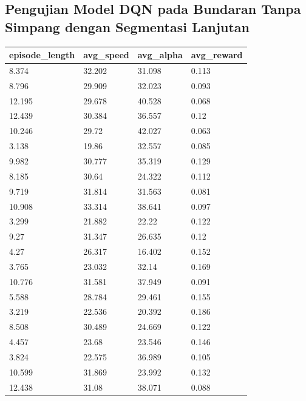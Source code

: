 \subsection{Pengujian Model DQN pada Bundaran Tanpa Simpang dengan Segmentasi Lanjutan}
\label{sec:pengujian_dqn_bundaran_nosimpang_segmentasi_hitam_putih}

\begin{table}[H]
	\begin{tabular}{|l|l|l|l|}
		\hline
		episode\_length & avg\_speed  & avg\_alpha  & avg\_reward \\ \hline
		8.374           & 32.202 & 31.098 & 0.113  \\ \hline
		8.796           & 29.909 & 32.023 & 0.093  \\ \hline
		12.195          & 29.678 & 40.528 & 0.068  \\ \hline
		12.439          & 30.384 & 36.557 & 0.12   \\ \hline
		10.246          & 29.72  & 42.027 & 0.063  \\ \hline
		3.138           & 19.86  & 32.557 & 0.085  \\ \hline
		9.982           & 30.777 & 35.319 & 0.129  \\ \hline
		8.185           & 30.64  & 24.322 & 0.112  \\ \hline
		9.719           & 31.814 & 31.563 & 0.081  \\ \hline
		10.908          & 33.314 & 38.641 & 0.097  \\ \hline
		3.299           & 21.882 & 22.22  & 0.122  \\ \hline
		9.27            & 31.347 & 26.635 & 0.12   \\ \hline
		4.27            & 26.317 & 16.402 & 0.152  \\ \hline
		3.765           & 23.032 & 32.14  & 0.169  \\ \hline
		10.776          & 31.581 & 37.949 & 0.091  \\ \hline
		5.588           & 28.784 & 29.461 & 0.155  \\ \hline
		3.219           & 22.536 & 20.392 & 0.186  \\ \hline
		8.508           & 30.489 & 24.669 & 0.122  \\ \hline
		4.457           & 23.68  & 23.546 & 0.146  \\ \hline
		3.824           & 22.575 & 36.989 & 0.105  \\ \hline
		10.599          & 31.869 & 23.992 & 0.132  \\ \hline
		12.438          & 31.08  & 38.071 & 0.088  \\ \hline

\end{tabular}
\end{table}
